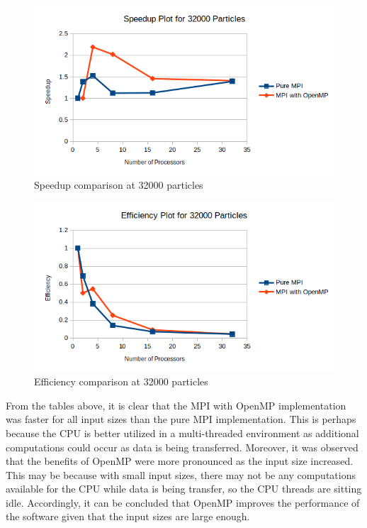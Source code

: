 \documentclass{article}
\begin{document}
\begin{figure}[H]
	\begin{center}
		\hspace*{-0.5cm}                                                           
  		\includegraphics[scale=0.7]{Report_Assets/speedup32000.png}
  	\end{center}
  	\caption{Speedup comparison at 32000 particles}
\end{figure}

\begin{figure}[H]
	\begin{center}
		\hspace*{-0.5cm}                                                           
  		\includegraphics[scale=0.7]{Report_Assets/efficiency32000.png}
  	\end{center}
  	\caption{Efficiency comparison at 32000 particles}
\end{figure}

From the tables above, it is clear that the MPI with OpenMP implementation was faster for all input sizes than the pure MPI implementation. This is perhaps because the CPU is better utilized in a multi-threaded environment as additional computations could occur as data is being transferred. Moreover, it was observed that the benefits of OpenMP were more pronounced as the input size increased. This may be because with small input sizes, there may not be any computations available for the CPU while data is being transfer, so the CPU threads are sitting idle. Accordingly, it can be concluded that OpenMP improves the performance of the software given that the input sizes are large enough.
\end{document}
